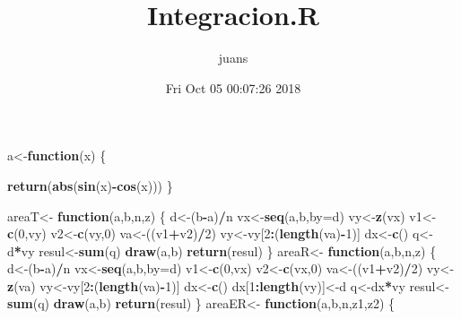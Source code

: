 \documentclass[]{article}
\title{Integracion.R}
\author{juans}
\date{Fri Oct 05 00:07:26 2018}
\newenvironment{Shaded}{\begin{snugshade}}{\end{snugshade}}
\newcommand{\KeywordTok}[1]{\textcolor[rgb]{0.13,0.29,0.53}{\textbf{#1}}}
\newcommand{\DataTypeTok}[1]{\textcolor[rgb]{0.13,0.29,0.53}{#1}}
\newcommand{\DecValTok}[1]{\textcolor[rgb]{0.00,0.00,0.81}{#1}}
\newcommand{\StringTok}[1]{\textcolor[rgb]{0.31,0.60,0.02}{#1}}
\newcommand{\ControlFlowTok}[1]{\textcolor[rgb]{0.13,0.29,0.53}{\textbf{#1}}}
\newcommand{\OperatorTok}[1]{\textcolor[rgb]{0.81,0.36,0.00}{\textbf{#1}}}
\newcommand{\NormalTok}[1]{#1}
\begin{document}
\maketitle

\begin{Shaded}
\begin{Highlighting}[]
\NormalTok{a<-}\ControlFlowTok{function}\NormalTok{(x)}
\NormalTok{\{}
  
  \KeywordTok{return}\NormalTok{(}\KeywordTok{abs}\NormalTok{(}\KeywordTok{sin}\NormalTok{(x)}\OperatorTok{-}\KeywordTok{cos}\NormalTok{(x)))}
\NormalTok{\}}

\NormalTok{areaT<-}\StringTok{ }\ControlFlowTok{function}\NormalTok{(a,b,n,z) \{}
\NormalTok{  d<-(b}\OperatorTok{-}\NormalTok{a)}\OperatorTok{/}\NormalTok{n}
\NormalTok{  vx<-}\KeywordTok{seq}\NormalTok{(a,b,}\DataTypeTok{by=}\NormalTok{d)}
\NormalTok{  vy<-}\KeywordTok{z}\NormalTok{(vx)}
\NormalTok{  v1<-}\KeywordTok{c}\NormalTok{(}\DecValTok{0}\NormalTok{,vy)}
\NormalTok{  v2<-}\KeywordTok{c}\NormalTok{(vy,}\DecValTok{0}\NormalTok{)}
\NormalTok{  va<-((v1}\OperatorTok{+}\NormalTok{v2)}\OperatorTok{/}\DecValTok{2}\NormalTok{)}
\NormalTok{  vy<-vy[}\DecValTok{2}\OperatorTok{:}\NormalTok{(}\KeywordTok{length}\NormalTok{(va)}\OperatorTok{-}\DecValTok{1}\NormalTok{)]}
\NormalTok{  dx<-}\KeywordTok{c}\NormalTok{()}
\NormalTok{  q<-d}\OperatorTok{*}\NormalTok{vy}
\NormalTok{  resul<-}\KeywordTok{sum}\NormalTok{(q)}
  \KeywordTok{draw}\NormalTok{(a,b)}
  \KeywordTok{return}\NormalTok{(resul)}
\NormalTok{\}}
\NormalTok{areaR<-}\StringTok{ }\ControlFlowTok{function}\NormalTok{(a,b,n,z) \{}
\NormalTok{  d<-(b}\OperatorTok{-}\NormalTok{a)}\OperatorTok{/}\NormalTok{n}
\NormalTok{  vx<-}\KeywordTok{seq}\NormalTok{(a,b,}\DataTypeTok{by=}\NormalTok{d)}
\NormalTok{  v1<-}\KeywordTok{c}\NormalTok{(}\DecValTok{0}\NormalTok{,vx)}
\NormalTok{  v2<-}\KeywordTok{c}\NormalTok{(vx,}\DecValTok{0}\NormalTok{)}
\NormalTok{  va<-((v1}\OperatorTok{+}\NormalTok{v2)}\OperatorTok{/}\DecValTok{2}\NormalTok{)}
\NormalTok{  vy<-}\KeywordTok{z}\NormalTok{(va)}
\NormalTok{  vy<-vy[}\DecValTok{2}\OperatorTok{:}\NormalTok{(}\KeywordTok{length}\NormalTok{(va)}\OperatorTok{-}\DecValTok{1}\NormalTok{)]}
\NormalTok{  dx<-}\KeywordTok{c}\NormalTok{()}
\NormalTok{  dx[}\DecValTok{1}\OperatorTok{:}\KeywordTok{length}\NormalTok{(vy)]<-d}
\NormalTok{  q<-dx}\OperatorTok{*}\NormalTok{vy}
\NormalTok{  resul<-}\KeywordTok{sum}\NormalTok{(q)}
  \KeywordTok{draw}\NormalTok{(a,b)}
  \KeywordTok{return}\NormalTok{(resul)}
\NormalTok{\}}
\NormalTok{areaER<-}\StringTok{ }\ControlFlowTok{function}\NormalTok{(a,b,n,z1,z2) \{}

\end{Highlighting}
\end{Shaded}
\end{document}
